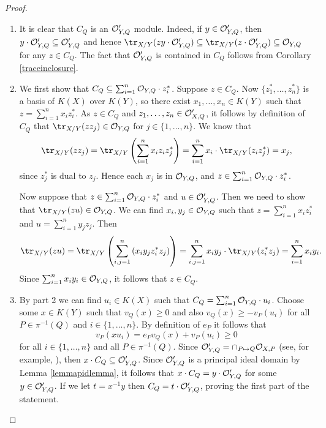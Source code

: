     \begin{proof}
        \begin{enumerate}
        \item It is clear that $C_Q$ is an ${\cal O}_{Y,Q}'$ module.
        Indeed, if $y\in {\cal O}_{Y,Q}'$, then $y\cdot {\cal O}_{Y,Q}' \subseteq {\cal O}_{Y,Q}'$ and hence $\tr_{X/Y}(z y\cdot \cO_{Y,Q}')\subseteq \tr_{X/Y}(z\cdot \cO_{Y,Q}') \subseteq \cO_{Y,Q}$ for any $z\in C_Q$.
        The fact that ${\cal O}_{Y,Q}'$ is contained in $C_Q$ follows from Corollary \ref{traceinclosure}.
        \item We first show that $C_Q \subseteq \sum_{i=1}^n {\cal O}_{Y,Q}\cdot z_i^*$.
        Suppose $z\in C_Q$.
        Now $\{z_1^*, \ldots ,z_n^*\}$ is a basis of $K(X)$ over $K(Y)$, so there exist $x_1,\ldots , x_n\in K(Y)$ such that $z=\sum_{i=1}^n x_iz_i^*$.
        As $z\in C_Q$ and $z_1,\ldots ,z_n\in {\cal O}_{X,Q}'$, it follows by definition of $C_Q$ that $\tr_{X/Y}(zz_j)\in \cO_{Y,Q}$ for $j\in \{1,\ldots ,n\}$.
        We know that 
            \[
            \tr_{X/Y}(zz_j) = \tr_{X/Y}\left(\sum_{i=1}^nx_iz_iz_j^*\right) = \sum_{i=1}^nx_i \cdot \tr_{X/Y}(z_iz_j^*) = x_j,
            \]
        since $z_j^*$ is dual to $z_j$.
        Hence each $x_j$ is in ${\cal O}_{Y,Q}$, and $z\in \sum_{i=1}^n{\cal O}_{Y,Q}\cdot z_i^*$.
        
        Now suppose that $z\in \sum_{i=1}^n{\cal O}_{Y,Q}\cdot z_i^*$ and $u\in {\cal O}_{Y,Q}'$.
        Then we need to show that $\tr_{X/Y}(z u)\in \cO_{Y,Q}$.
        We can find $x_i, y_j\in {\cal O}_{Y,Q}$ such that $z=\sum_{i=1}^n x_iz_i^*$ and $u=\sum_{i=1}^ny_jz_j$.
        Then
            \[
            \tr_{X/Y}(zu) = \tr_{X/Y}\left(\sum_{i,j=1}^n \left(x_iy_jz_i^*z_j\right)\right) = \sum_{i,j=1}^n x_iy_j\cdot \tr_{X/Y}(z_i^*z_j) = \sum_{i=1}^n x_iy_i.
            \]
        Since $\sum_{i=1}^n x_iy_i\in {\cal O}_{Y,Q}$, it follows that $z\in C_Q$.
            
        \item By part 2 we can find $u_i\in K(X)$ such that $C_Q = \sum_{i=1}^n {\cal O}_{Y,Q} \cdot u_i$.
        Choose some $x\in K(Y)$ such that $v_Q(x)\geq 0$ and also $v_Q(x)\geq -v_P(u_i)$ for all $P\in \pi^{-1}(Q)$ and $i\in \{1,\ldots ,n\}$.
        By definition of $e_P$ it follows that
            \[ 
            v_P(xu_i) = e_Pv_Q(x) + v_P(u_i) \geq 0
            \]
        for all $i\in \{1,\ldots, n\}$ and all $P\in \pi^{-1}(Q)$.
        Since ${\cal O}'_{Y,Q} = \cap_{P\mapsto Q} {\cal O}_{X,P}$ (see, for example, \cite[Cor. 3.3.5]{stichtenoth}), then $x\cdot C_Q \subseteq {\cal O}_{Y,Q}'$.
        Since ${\cal O}_{Y,Q}'$ is a principal ideal domain by Lemma \ref{lemmapidlemma}, it follows that $x\cdot C_Q = y\cdot {\cal O}_{Y,Q}'$ for some $y\in {\cal O}_{Y,Q}'$.
        If we let $t=x^{-1}y$ then $C_Q =t\cdot {\cal O}_{Y,Q}'$, proving the first part of the statement.
        

\end{enumerate}
\end{proof}
